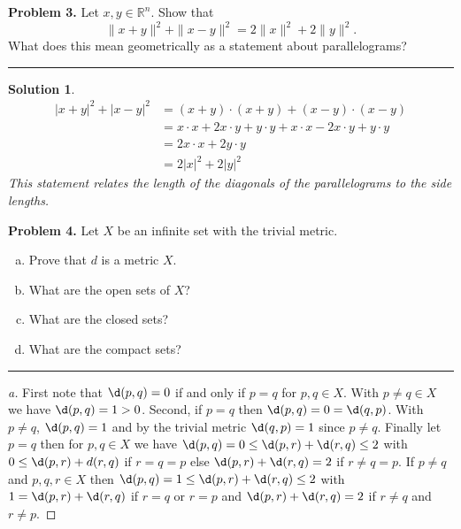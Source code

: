 \documentclass[leqno]{article}
\theoremstyle{nonumberplain}
\newtheorem{proof}{Proof}
\newtheorem{solution}{Solution}
\begin{document}
\pagebreak




\noindent\textbf{Problem 3.} Let $x,y\in \mathbb{R}^n$. Show that
\[
\|x+y\|^2+\|x-y\|^2=2\|x\|^2+2\|y\|^2.
\]
What does this mean geometrically as a statement about parallelograms?

\noindent\rule[0.5ex]{\linewidth}{1pt}

\begin{solution}
\begin{align*}
|x+y|^2+|x-y|^2&=(x+y)\cdot(x+y)+(x-y)\cdot (x-y)\\
&=x\cdot x + 2x\cdot y + y\cdot y + x\cdot x -2x\cdot y + y\cdot y\\
&=2x\cdot x +2y\cdot y\\
&=2|x|^2+2|y|^2
\end{align*}
This statement relates the length of the diagonals of the parallelograms to the side lengths.
\end{solution}

\pagebreak





\noindent\textbf{Problem 4.} Let $X$ be an infinite set with the trivial metric.
\begin{enumerate}[(a)]
\item Prove that $d$ is a metric $X$.
\item What are the open sets of $X$?
\item What are the closed sets?
\item What are the compact sets?
\end{enumerate}

\noindent\rule[0.5ex]{\linewidth}{1pt}

\begin{proof}[a] 
First note that $\d(p,q)=0$ if and only if $p=q$ for $p,q\in X$. With $p\neq q \in X$ we have $\d(p,q)=1>0$. Second, if $p=q$ then $\d(p,q)=0=\d(q,p)$. With $p\neq q$, $\d(p,q)=1$ and by the trivial metric $\d(q,p)=1$ since $p\neq q$.  Finally let $p=q$ then for $p,q \in X$ we have $\d(p,q)=0\leq \d(p,r)+\d(r,q)\leq 2$ with $0\leq \d(p,r)+d(r,q)$ if $r=q=p$ else $\d(p,r)+\d(r,q)=2$ if $r\neq q = p$.  If $p\neq q$ and $p,q,r\in X$ then $\d(p,q)=1\leq \d(p,r)+\d(r,q)\leq 2$ with $1=\d(p,r)+\d(r,q)$ if $r=q$ or $r=p$ and $\d(p,r)+\d(r,q)=2$ if $r\neq q$ and $r\neq p$.
\end{proof}
\end{document}
